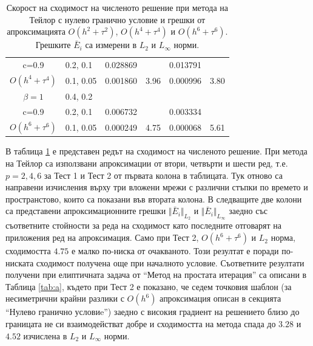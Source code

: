 \documentclass{article}
\theoremstyle{remark}
\begin{document}
\begin{table}[ht]
\begin{tabular}{||c|l|ll|ll||}
       c=0.9                 &0.2, 0.1     & 0.028869   &        &  0.013791   &   \\
 $O(h^4+ \tau^4)$ 	&0.1, 0.05   	&0.001860 	& 3.96  & 0.000996  & 3.80  \\
\hline
  $\beta=1$     		&0.4, 0.2   	&            	&          	&                  &      \\
      c=0.9                  &0.2, 0.1   	&0.006732 	&            & 0.003334      &       \\
 $O(h^6+ \tau^6)$ 	&0.1, 0.05 	& 0.000249 	& 4.75 	& 0.000068  & 5.61        \\
\hline
\hline 
		\end{tabular}
		\caption{Скорост на сходимост на численото решение при метода на Тейлор с нулево гранично условие и грешки от апроксимацията $O(h^{2} + \tau^2 )$, $O(h^{4} + \tau^4 )$ и $O(h^{6} + \tau^6 )$. Грешките $\bar E_i$ са измерени в $L_2$ и $L_\infty$ норми.}
\label{tableA}
\end{table}
В таблица \ref{tableA} е представен редът на сходимост на численото решение. При метода на Тейлор са използвани апроксимации от втори, четвърти и шести ред, т.е. $p=2,4,6$ за Тест 1 и Тест 2 от първата колона в таблицата. Тук отново са направени изчисления върху три вложени мрежи с различни стъпки по времето и пространстово, които са показани във втората колона. В следващите две колони са представени апроксимационните грешки $\Vert \bar E_i \Vert_{L_2} $ и $\Vert \bar E_i \Vert_{L_\infty}$ заедно със съответните стойности за реда на сходимост като последните отговарят на приложения ред на апроксимация. Само при Тест 2, $O(h^6 + \tau^6)$ и $L_2$ норма, сходимостта $4.75$ е малко по-ниска от очакваното. Този резултат е поради по-ниската сходимост получена още при началното условие. Съответните резултати получени при елиптичната задача от ``Метод на простата итерация'' са описани в Таблица \ref{tab:a}, където при Тест 2 е показано, че седем точковия шаблон (за несиметрични крайни разлики с $O(h^6)$ апроксимация описан в секцията ``Нулево гранично условиe'') заедно с високия градиент на решението близо до границата не си взаимодействат добре и сходимостта на метода спада до $3.28$ и $4.52$ изчислена в $L_2$ и $L_\infty$ норми. 
\end{document}
